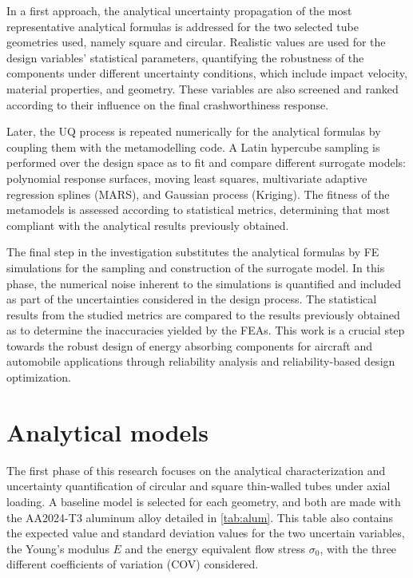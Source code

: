 \documentclass[12pt,number,preprint,review,times]{elsarticle}
\begin{document}
In a first approach, the analytical uncertainty propagation of the most representative analytical formulas is addressed for the two selected tube geometries used, namely square and circular. Realistic values are used for the design variables' statistical parameters, quantifying the robustness of the components under different uncertainty conditions, which include impact velocity, material properties, and geometry. These variables are also screened and ranked according to their influence on the final crashworthiness response. 

Later, the UQ process is repeated numerically for the analytical formulas by coupling them with the metamodelling code. A Latin hypercube sampling is performed over the design space as to fit and compare different surrogate models: polynomial response surfaces, moving least squares, multivariate adaptive regression splines (MARS), and Gaussian process (Kriging). The fitness of the metamodels is assessed according to statistical metrics, determining that most compliant with the analytical results previously obtained. 

The final step in the investigation substitutes the analytical formulas by FE simulations for the sampling and construction of the surrogate model. In this phase, the numerical noise inherent to the simulations is quantified and included as part of the uncertainties considered in the design process. The statistical results from the studied metrics are compared to the results previously obtained as to determine the inaccuracies yielded by the FEAs. This work is a crucial step towards the robust design of energy absorbing components for aircraft and automobile applications through reliability analysis and reliability-based design optimization. %

\section{Analytical models}
\label{sec:intro}
The first phase of this research focuses on the analytical characterization and uncertainty quantification of circular and square thin-walled tubes under axial loading. A baseline model is selected for each geometry, and both are made with the AA2024-T3 aluminum alloy detailed in \cref{tab:alum}. This table also contains the expected value and standard deviation values for the two uncertain variables, the Young's modulus $E$ and the energy equivalent flow stress $\sigma_0$, with the three different coefficients of variation (COV) considered.
\end{document}
